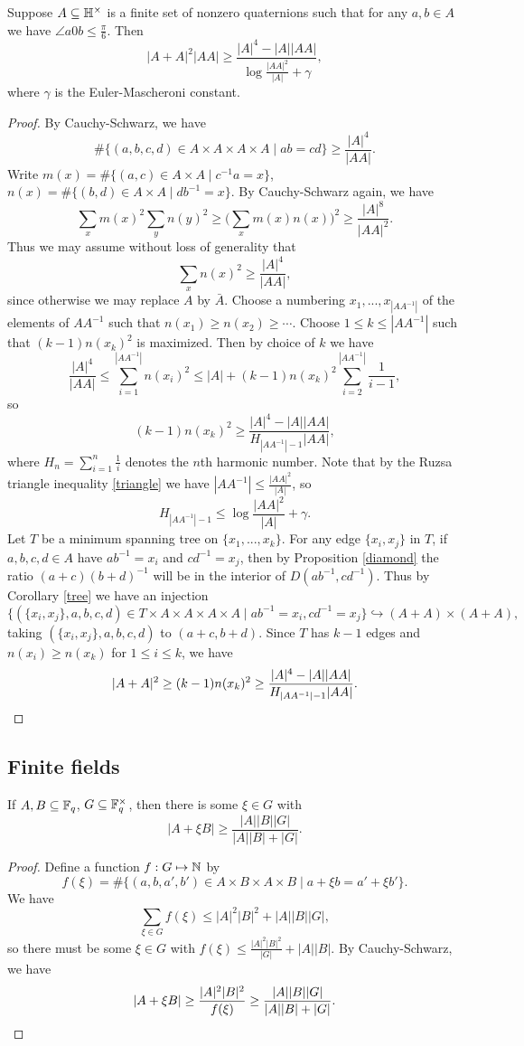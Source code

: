 \begin{thm} Suppose $A \subseteq\mathbb{H}^\times$ is a finite set of nonzero quaternions such that for any $a,b \in A$ we have $\angle a0b \le \frac{\pi}{6}$. Then
\[
|A+A|^2|AA| \ge \frac{|A|^4-|A||AA|}{\log\frac{|AA|^2}{|A|}+\gamma},
\]
where $\gamma$ is the Euler-Mascheroni constant.
\end{thm}
\begin{proof} By Cauchy-Schwarz, we have
\[
\#\{(a,b,c,d)\in A\times A\times A\times A\mid ab = cd\} \ge \frac{|A|^4}{|AA|}.
\]
Write $m(x) = \#\{(a,c) \in A\times A\mid c^{-1}a = x\}$, $n(x) = \#\{(b,d) \in A\times A\mid db^{-1} = x\}$. By Cauchy-Schwarz again, we have
\[
\sum_x m(x)^2\sum_y n(y)^2 \ge \Big(\sum_x m(x)n(x)\Big)^2 \ge \frac{|A|^8}{|AA|^2}.
\]
Thus we may assume without loss of generality that
\[
\sum_x n(x)^2 \ge \frac{|A|^4}{|AA|},
\]
since otherwise we may replace $A$ by $\bar{A}$. Choose a numbering $x_1, ..., x_{|AA^{-1}|}$ of the elements of $AA^{-1}$ such that $n(x_1) \ge n(x_2) \ge \cdots$. Choose $1 \le k \le |AA^{-1}|$ such that $(k-1)n(x_k)^2$ is maximized. Then by choice of $k$ we have
\[
\frac{|A|^4}{|AA|} \le \sum_{i=1}^{|AA^{-1}|} n(x_i)^2 \le |A| + (k-1)n(x_k)^2\sum_{i=2}^{|AA^{-1}|} \frac{1}{i-1},
\]
so
\[
(k-1)n(x_k)^2 \ge \frac{|A|^4-|A||AA|}{H_{|AA^{-1}|-1}|AA|},
\]
where $H_n = \sum_{i=1}^n \frac{1}{i}$ denotes the $n$th harmonic number. Note that by the Ruzsa triangle inequality \ref{triangle} we have $|AA^{-1}| \le \frac{|AA|^2}{|A|}$, so
\[
H_{|AA^{-1}|-1} \le \log\frac{|AA|^2}{|A|}+\gamma.
\]
Let $T$ be a minimum spanning tree on $\{x_1, ..., x_k\}$. For any edge $\{x_i,x_j\}$ in $T$, if $a,b,c,d \in A$ have $ab^{-1} = x_i$ and $cd^{-1} = x_j$, then by Proposition \ref{diamond} the ratio $(a+c)(b+d)^{-1}$ will be in the interior of $D(ab^{-1},cd^{-1})$. Thus by Corollary \ref{tree} we have an injection
\[
\{(\{x_i,x_j\},a,b,c,d)\in T\times A\times A\times A\times A\mid ab^{-1}=x_i, cd^{-1}=x_j\} \hookrightarrow (A+A)\times (A+A),
\]
taking $(\{x_i,x_j\},a,b,c,d)$ to $(a+c,b+d)$. Since $T$ has $k-1$ edges and $n(x_i) \ge n(x_k)$ for $1 \le i \le k$, we have
\[
|A+A|^2 \ge (k-1)n(x_k)^2 \ge \frac{|A|^4-|A||AA|}{H_{|AA^{-1}|-1}|AA|}.\qedhere
\]
\end{proof}

\subsection{Finite fields}

\begin{lem}\label{xi} If $A,B \subseteq \mathbb{F}_q$, $G \subseteq \mathbb{F}_q^\times$, then there is some $\xi \in G$ with
\[
|A+\xi B| \ge \frac{|A||B||G|}{|A||B|+|G|}.
\]
\end{lem}
\begin{proof} Define a function $f:G\mapsto \mathbb{N}$ by
\[
f(\xi) = \#\{(a,b,a',b')\in A\times B\times A\times B\mid a+\xi b = a'+\xi b'\}.
\]
We have
\[
\sum_{\xi \in G} f(\xi) \le |A|^2|B|^2 + |A||B||G|,
\]
so there must be some $\xi \in G$ with $f(\xi) \le \frac{|A|^2|B|^2}{|G|} + |A||B|$. By Cauchy-Schwarz, we have
\[
|A+\xi B| \ge \frac{|A|^2|B|^2}{f(\xi)} \ge \frac{|A||B||G|}{|A||B|+|G|}.\qedhere
\]
\end{proof}

